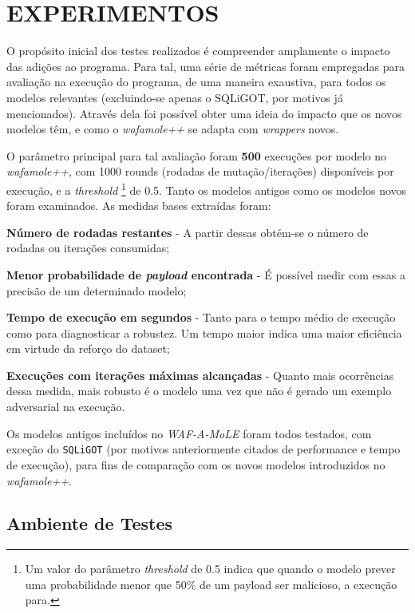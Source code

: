 \chapter{EXPERIMENTOS}
\label{chp:capitulo5}

O propósito inicial dos testes realizados é compreender amplamente o impacto das adições ao programa. Para tal, uma série de métricas foram empregadas para avaliação na execução do programa, de uma maneira exaustiva, para todos os modelos relevantes (excluindo-se apenas o SQLiGOT, por motivos já mencionados). Através dela foi possível obter uma ideia do impacto que os novos modelos têm, e como o \textit{wafamole++} se adapta com \textit{wrappers} novos.

O parâmetro principal para tal avaliação foram \textbf{500} execuções por modelo no \textit{wafamole++}, com 1000 rounds (rodadas de mutação/iterações) disponíveis por execução, e a \textit{threshold} \footnote{Um valor do parâmetro \textit{threshold} de 0.5 indica que quando o modelo prever uma probabilidade menor que 50\% de um payload ser malicioso, a execução para.} de 0.5. Tanto os modelos antigos como os modelos novos foram examinados. As medidas bases extraídas foram:
\begin{alineas}
\item \textbf{Número de rodadas restantes} - A partir dessas obtém-se o número de rodadas ou iterações consumidas;
\item \textbf{Menor probabilidade de \textit{payload} encontrada} - É possível medir com essas a precisão de um determinado modelo;
\item \textbf{Tempo de execução em segundos} - Tanto para o tempo médio de execução como para diagnosticar a robustez. Um tempo maior indica uma maior eficiência em virtude da reforço do dataset;
\item \textbf{Execuções com iterações máximas alcançadas} - Quanto mais ocorrências dessa medida, mais robusto é o modelo uma vez que não é gerado um exemplo adversarial na execução.
\end{alineas}

Os modelos antigos incluídos no \textit{WAF-A-MoLE} foram todos testados, com exceção do \verb+SQLiGOT+ (por motivos anteriormente citados de performance e tempo de execução), para fins de comparação com os novos modelos introduzidos no \textit{wafamole++}.

\section{Ambiente de Testes}

